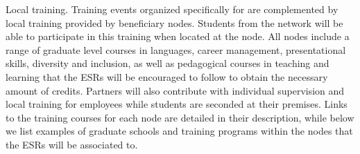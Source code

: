 \noindent \color{blue}Local training. \color{black}
Training events organized specifically for \acronym are complemented by local training provided by beneficiary nodes. 
Students from the network will be able to participate in this training when located at the node. 
All nodes include a range of graduate level courses in languages, career management, presentational skills, diversity and inclusion, as  well as pedagogical courses in teaching and learning that the ESRs will be encouraged to follow to obtain the necessary amount of credits. 
Partners will also contribute with individual supervision and local training for employees while students are seconded at their premises. 
Links to the training courses for each node are detailed in their description, while below we list examples of graduate schools and training programs within the nodes that the ESRs will be associated to. 
